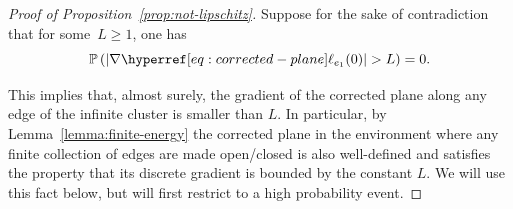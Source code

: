 \documentclass[12pt]{amsart}
\numberwithin{equation}{section}
\begin{document}
	\begin{proof}[Proof of Proposition~\ref{prop:not-lipschitz}]
		Suppose for the sake of contradiction that for some~$L \geq 1$, one has
		\begin{equation*}
			\P \left( \left| \nabla \ellp{e_1}(0) \right|  > L \right) = 0 .
		\end{equation*}

		This implies that, almost surely, the gradient of the corrected plane along any edge of the infinite cluster is smaller than $L$. In particular, by Lemma~\ref{lemma:finite-energy} the corrected plane in the environment where any finite collection of edges are made open/closed is also well-defined and satisfies the property that its discrete gradient is bounded by the constant $L$. We will use this fact below, but will first restrict to a high probability event.
		

\end{proof}
\end{document}
